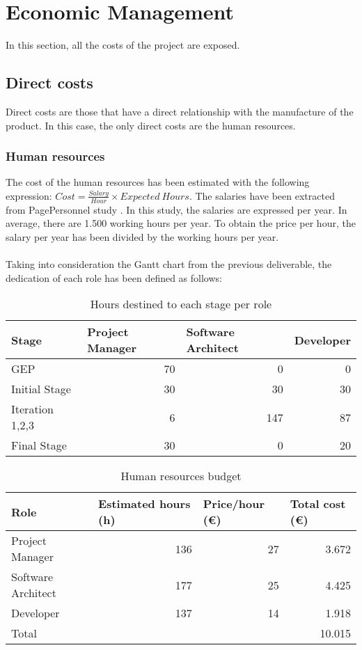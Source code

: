 \chapter{Economic Management}
\label{Chapter7}

In this section, all the costs of the project are exposed. 
\section{Direct costs}
Direct costs are those that have a direct relationship with the manufacture of the product. In this case, the only direct costs are the human resources. 

\subsection{Human resources}
The cost of the human resources has been estimated with the following expression: $Cost = \frac{Salary}{Hour} \times Expected \ Hours$. The salaries have been extracted from PagePersonnel study \cite{PagePersonnel}. In this study, the salaries are expressed per year. In average, there are 1.500 working hours per year. To obtain the price per hour, the salary per year has been divided by the working hours per year.\\\\
Taking into consideration the Gantt chart from the previous deliverable, the dedication of each role has been defined as follows:

\begin{table}[h!]
	\centering
	\begin{tabular}{|l|r|r|r|}
		\hline
		Stage & \multicolumn{1}{l|}{Project Manager} & \multicolumn{1}{l|}{Software Architect} & \multicolumn{1}{l|}{Developer} \\ \hline
		GEP & 70 & 0 & 0 \\ \hline
		Initial Stage & 30 & 30 & 30 \\ \hline
		Iteration 1,2,3 & 6 & 147 & 87 \\ \hline
		Final Stage & 30 & 0 & 20 \\ \hline
	\end{tabular}
	\caption{Hours destined to each stage per role}
	\label{StageResources}
\end{table}
\begin{table}[h!]
	\centering
	\begin{tabular}{|l|r|r|r|}
		\hline
		Role & \multicolumn{1}{l|}{Estimated hours (h)} & \multicolumn{1}{l|}{Price/hour (€)} & \multicolumn{1}{l|}{Total cost (€)} \\ \hline
		Project Manager & 136 & 27  & 3.672 \\ \hline
		Software Architect & 177 & 25 & 4.425 \\ \hline
		Developer & 137 & 14 & 1.918 \\ \hline\hline
		Total & \multicolumn{3}{r|}{10.015} \\ \hline
	\end{tabular}
	\caption{Human resources budget}
	\label{HumanResources}
\end{table}

